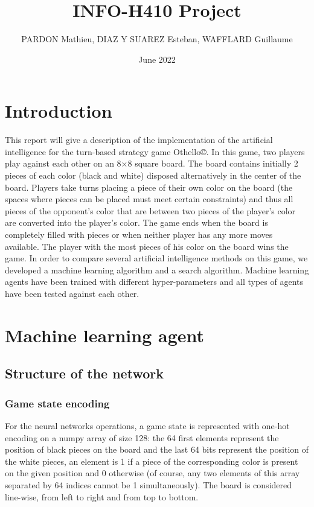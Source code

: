 \documentclass{article}
\title{INFO-H410 Project}
\author{PARDON Mathieu, DIAZ Y SUAREZ Esteban, WAFFLARD Guillaume}
\date{June 2022}
\begin{document}
\maketitle
\tableofcontents
\clearpage


\section{Introduction}

This report will give a description of the implementation of the artificial intelligence for the turn-based strategy game Othello\copyright. In this game, two players play against each other on an 8×8 square board. The board contains initially 2 pieces of each color (black and white) disposed alternatively in the center of the board. Players take turns placing a piece of their own color on the board (the spaces where pieces can be placed must meet certain constraints) and thus all pieces of the opponent's color that are between two pieces of the player's color are converted into the player's color. The game ends when the board is completely filled with pieces or when neither player has any more moves available. The player with the most pieces of his color on the board wins the game. In order to compare several artificial intelligence methods on this game, we developed a machine learning algorithm and a search algorithm. Machine learning agents have been trained with different hyper-parameters and all types of agents have been tested against each other.


\section{Machine learning agent}\label{sec:ml}

\subsection{Structure of the network}

\subsubsection{Game state encoding}

For the neural networks operations, a game state is represented with one-hot encoding on a numpy array of size 128: the 64 first elements represent the position of black pieces on the board and the last 64 bits represent the position of the white pieces, an element is 1 if a piece of the corresponding color is present on the given position and 0 otherwise (of course, any two elements of this array separated by 64 indices cannot be 1 simultaneously). The board is considered line-wise, from left to right and from top to bottom.
\end{document}
